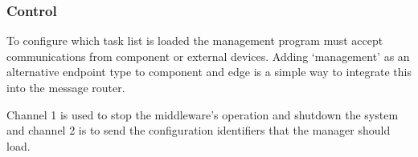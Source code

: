 \subsubsection{Control}
To configure which task list is loaded the management program must accept communications from component or external devices. Adding `management' as an alternative endpoint type to component and edge is a simple way to integrate this into the message router.

Channel 1 is used to stop the middleware's operation and shutdown the system and channel 2 is to send the configuration identifiers that the manager should load.

\clearpage


% 

% 

% 






